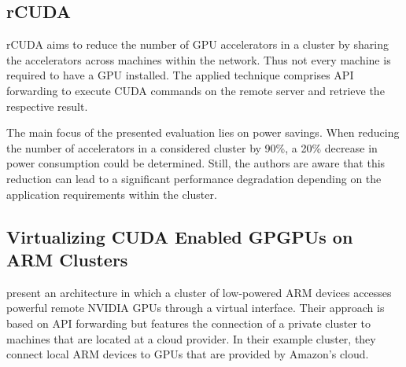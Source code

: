 \subsection*{rCUDA}

rCUDA aims to reduce the number of GPU accelerators in a cluster by sharing the accelerators across machines within the network\cite{rcuda}. Thus not every machine is required to have a GPU installed. The applied technique comprises API forwarding to execute CUDA commands on the remote server and retrieve the respective result.

The main focus of the presented evaluation lies on power savings. When reducing the number of accelerators in a considered cluster by 90\%, a 20\% decrease in power consumption could be determined. Still, the authors are aware that this reduction can lead to a significant performance degradation depending on the application requirements within the cluster.

\subsection*{Virtualizing CUDA Enabled GPGPUs on ARM Clusters}

\citeauthor{arm_virtual_cuda} present an architecture in which a cluster of low-powered ARM devices accesses powerful remote NVIDIA GPUs through a virtual interface\cite{arm_virtual_cuda}. Their approach is based on API forwarding but features the connection of a private cluster to machines that are located at a cloud provider. In their example cluster, they connect local ARM devices to GPUs that are provided by Amazon's cloud.

